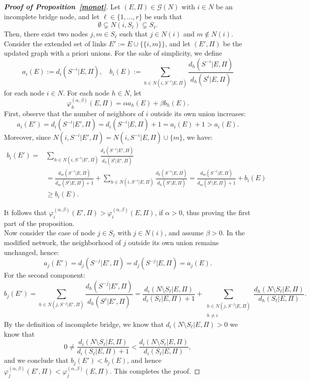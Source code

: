 \documentclass[preprint,11pt,authoryear]{elsarticle}
\newcommand{\dsum}{\displaystyle\sum}
\theoremstyle{plain}
\begin{document}
\begin{proof}[\bf Proof of Proposition~\ref{monot}]
	Let $(E,\Pi)\in\mathcal{G}(N)$ with \( i \in N \) be an incomplete bridge node, and let \( \ell \in \{1, \dots, r\} \) be such that
	\[
	\emptyset \subsetneq N(i, S_\ell) \subsetneq S_\ell.
	\]
	Then, there exist two nodes \( j, m \in S_\ell \) such that \( j \in N(i) \) and \( m \notin N(i) \). Consider the extended set of links \( E' := E \cup \{\{i, m\}\} \), and let \( (E', \Pi) \) be the updated graph with a priori unions.
	For the sake of simplicity, we define 
	$$a_i(E):= d_i(S^{-i}|E,\Pi), \quad b_i(E):=\dsum_{h \in N(i, S^{-i}|E,\Pi)} \dfrac{d_h(S^{-i}|E,\Pi)}{d_h(S^{i}|E,\Pi)}$$ 
	for each node $i\in N$. For each node \( h \in N \), let
	\[
	\varphi_h^{(\alpha,\beta)}(E, \Pi) = \alpha a_h(E) + \beta b_h(E).
	\]
	First, observe that the number of neighbors of \( i \) outside its own union increases:
	\[
	a_i(E') = d_i(S^{-i}|E',\Pi) = d_i(S^{-i}|E,\Pi) + 1 = a_i(E) + 1 > a_i(E).
	\]
	Moreover, since \( N(i, S^{-i}|E',\Pi) = N(i, S^{-i}|E,\Pi) \cup \{m\} \), we have:
	\begin{align*}
		b_i(E') = & \sum_{h \in N(i, S^{-i}|E',\Pi)} \frac{d_h(S^{-i}|E',\Pi)}{d_h(S^i|E',\Pi)} \\
		& = \frac{d_m(S^{-i}|E,\Pi)}{d_m(S^i|E,\Pi) + 1} + \sum_{h \in N(i, S^{-i}|E,\Pi)} \frac{d_h(S^{-i}|E,\Pi)}{d_h(S^i|E,\Pi)} 
		= \frac{d_m(S^{-i}|E,\Pi)}{d_m(S^i|E,\Pi) + 1} + b_i(E) \\
		&\geq b_i(E).
	\end{align*}
	
	It follows that \( \varphi_i^{(\alpha,\beta)}(E', \Pi) > \varphi_i^{(\alpha,\beta)}(E, \Pi) \), if $\alpha>0$, thus proving the first part of the proposition.\\
	
	Now consider the case of node \( j \in S_\ell \) with \( j \in N(i) \), and assume \( \beta > 0 \).  In the modified network, the neighborhood of \( j \) outside its own union remains unchanged, hence:
	\[
	a_j(E') = d_j(S^{-j}|E',\Pi) = d_j(S^{-j}|E,\Pi) = a_j(E).
	\]
	For the second component:
	\[
	b_j(E') = \sum_{h \in N(j, S^{-j}|E',\Pi)} \frac{d_h(S^{-j}|E',\Pi)}{d_h(S^j|E',\Pi)} 
	= \frac{d_i(N \setminus S_\ell|E,\Pi)}{d_i(S_\ell|E,\Pi) + 1} 
	+ \sum_{\substack{h \in N(j, S^{-j}|E,\Pi) \\ h \neq i}} \frac{d_h(N \setminus S_\ell|E,\Pi)}{d_h(S_\ell|E,\Pi)}.
	\]
	By the definition of incomplete bridge, we know that \( d_i(N \setminus S_\ell|E,\Pi) > 0 \) we know that
	\[
	0\not=\frac{d_i(N \setminus S_\ell|E,\Pi)}{d_i(S_\ell|E,\Pi) + 1} 
	< \frac{d_i(N \setminus S_\ell|E,\Pi)}{d_i(S_\ell|E,\Pi)},
	\]
	and we conclude that \( b_j(E') < b_j(E) \), and hence
	$
	\varphi_j^{(\alpha,\beta)}(E', \Pi) < \varphi_j^{(\alpha,\beta)}(E, \Pi).
	$
	This completes the proof.
\end{proof}
\end{document}
